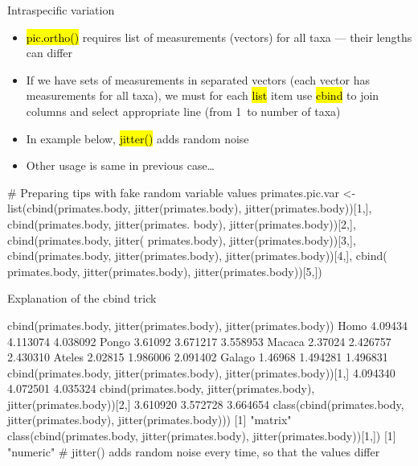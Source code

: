 \documentclass[compress, ucs, xelatex, 11pt, xcolor=svgnames,
	hyperref={
		bookmarks=true,
		unicode=true,
		colorlinks=true,
		pdftitle={Molecular data in R},
		plainpages=false,
		pdfauthor={Vojtech Zeisek},
		pdfsubject={Course about phylogeny and evolution in R},
		pdfcreator={XeLaTeX},
		pdfkeywords={R, evolution, phylogeny, molecular data},
		linkcolor=Tomato,
		anchorcolor=SaddleBrown,
		citecolor=Goldenrod,
		filecolor=DarkMagenta,
		menucolor=Sienna,
		urlcolor=DarkTurquoise,
		pdftex},
	url={hyphens, lowtilde} %
	]{beamer}
\renewcommand{\texttt}[1]{\hl{\ttfamily #1}}
\begin{document}
\begin{frame}[fragile]{Intraspecific variation}
	\begin{itemize}
		\item \texttt{pic.ortho()} requires list of measurements (vectors) for all taxa --- their lengths can differ
		\item If we have sets of measurements in separated vectors (each vector has measurements for all taxa), we must for each \texttt{list} item use \texttt{cbind} to join columns and select appropriate line (from 1~to number of taxa)
		\item In example below, \texttt{jitter()} adds random noise
		\item Other usage is same in previous case\ldots
	\end{itemize}
	\begin{spluscode}
    # Preparing tips with fake random variable values
    primates.pic.var <- list(cbind(primates.body, jitter(primates.body),
      jitter(primates.body))[1,], cbind(primates.body, jitter(primates.
      body), jitter(primates.body))[2,], cbind(primates.body, jitter(
      primates.body), jitter(primates.body))[3,], cbind(primates.body,
      jitter(primates.body), jitter(primates.body))[4,], cbind(
      primates.body, jitter(primates.body), jitter(primates.body))[5,])
	\end{spluscode}
\end{frame}

\begin{frame}[fragile]{Explanation of the cbind trick}
	\begin{spluscode}
    cbind(primates.body, jitter(primates.body), jitter(primates.body))
    Homo         4.09434 4.113074 4.038092
    Pongo        3.61092 3.671217 3.558953
    Macaca       2.37024 2.426757 2.430310
    Ateles       2.02815 1.986006 2.091402
    Galago       1.46968 1.494281 1.496831
    cbind(primates.body, jitter(primates.body), jitter(primates.body))[1,]
      4.094340      4.072501      4.035324
    cbind(primates.body, jitter(primates.body), jitter(primates.body))[2,]
      3.610920      3.572728      3.664654
    class(cbind(primates.body, jitter(primates.body),
      jitter(primates.body)))
    [1] "matrix"
    class(cbind(primates.body, jitter(primates.body),
      jitter(primates.body))[1,])
    [1] "numeric"
    # jitter() adds random noise every time, so that the values differ
	\end{spluscode}
\end{frame}
\end{document}
